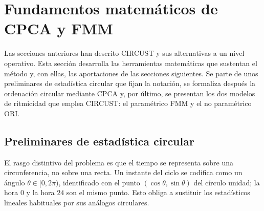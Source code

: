 \documentclass[12pt, a4paper]{report}
\begin{document}
\section{Fundamentos matemáticos de CPCA y FMM}
\label{sec:fundamentos}

Las secciones anteriores han descrito CIRCUST y sus alternativas a un nivel operativo. Esta sección desarrolla las herramientas matemáticas que sustentan el método y, con ellas, las aportaciones de las secciones siguientes. Se parte de unos preliminares de estadística circular que fijan la notación, se formaliza después la ordenación circular mediante CPCA y, por último, se presentan los dos modelos de ritmicidad que emplea CIRCUST: el paramétrico FMM y el no paramétrico ORI.

\subsection{Preliminares de estadística circular}
\label{subsec:estadistica-circular}

El rasgo distintivo del problema es que el tiempo se representa sobre una circunferencia, no sobre una recta. Un instante del ciclo se codifica como un ángulo $\theta\in[0,2\pi)$, identificado con el punto $(\cos\theta,\sin\theta)$ del círculo unidad; la hora $0$ y la hora $24$ son el mismo punto. Esto obliga a sustituir los estadísticos lineales habituales por sus análogos circulares.
\end{document}
